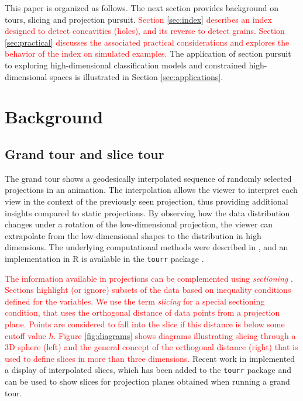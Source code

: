 \documentclass[]{interact}
\theoremstyle{plain}%
\theoremstyle{definition}
\theoremstyle{remark}
\begin{document}
This paper is organized as follows. The next section provides background
on tours, slicing and projection pursuit.
\textcolor{red}{Section \ref{sec:index} describes an index designed to detect concavities (holes), and its reverse to detect grains. Section \ref{sec:practical} discusses the associated practical considerations and explores the behavior of the index on simulated examples.}
The application of section pursuit to exploring high-dimensional
classification models and constrained high-dimensional spaces is
illustrated in Section \ref{sec:applications}.

\hypertarget{background}{%
\section{\texorpdfstring{Background
\label{sec:background}}{Background }}\label{background}}

\hypertarget{grand-tour-and-slice-tour}{%
\subsection{Grand tour and slice tour}\label{grand-tour-and-slice-tour}}

The grand tour shows a geodesically interpolated sequence of randomly
selected projections in an animation. The interpolation allows the
viewer to interpret each view in the context of the previously seen
projection, thus providing additional insights compared to static
projections. By observing how the data distribution changes under a
rotation of the low-dimensional projection, the viewer can extrapolate
from the low-dimensional shapes to the distribution in high dimensions.
The underlying computational methods were described in \citet{BCAH05},
and an implementation in R \citep{rlang} is available in the
\texttt{tourr} package \citep{tourr}.

\textcolor{red}{The information available in projections can be complemented using \textit{sectioning}}
\citep{prosection}.
\textcolor{red}{Sections highlight (or ignore) subsets of the data based on inequality conditions defined for the variables. We use the term \textit{slicing} for a special sectioning condition, that uses the orthogonal distance of data points from a projection plane. Points are considered to fall into the slice if this distance is below some cutoff value $h$. Figure \ref{fig:diagrams} shows diagrams illustrating slicing through a 3D sphere (left) and the general concept of the orthogonal distance (right) that is used to define slices in more than three dimensions.}
Recent work in \citet{laa2019slice} implemented a display of
interpolated slices, which has been added to the \texttt{tourr} package
and can be used to show slices for projection planes obtained when
running a grand tour.
\end{document}
